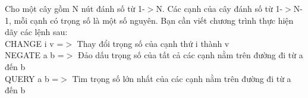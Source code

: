Cho một cây gồm N nút đánh số từ 1-$>$N. Các cạnh của cây đánh số từ 1-$>$N-1, mỗi cạnh có trọng số là một số nguyên. Bạn cần viết chương trình thực hiện dãy các lệnh sau:   
\\   CHANGE i v =$>$ Thay đổi trọng số của cạnh thứ i thành v   
\\   NEGATE a b =$>$ Đảo dấu trọng số của tất cả các cạnh nằm trên đường đi từ a đến b   
\\   QUERY a b =$>$ Tìm trọng số lớn nhất của các cạnh nằm trên đường đi từ a đến b
